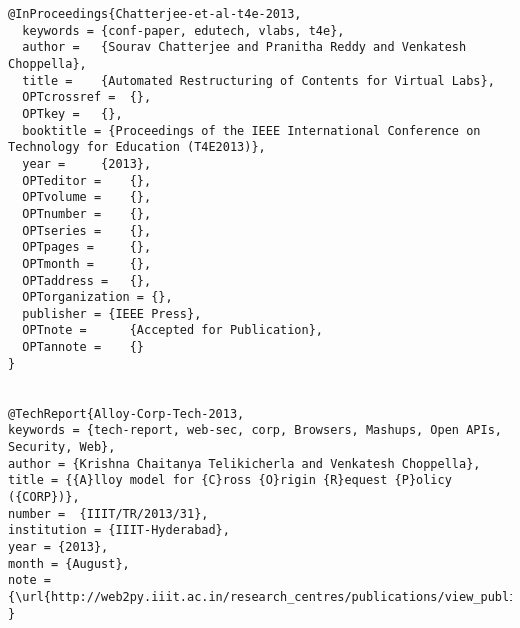 \documentclass[11pt]{article}
\begin{document}
\begin{lstlisting}
@InProceedings{Chatterjee-et-al-t4e-2013,
  keywords = {conf-paper, edutech, vlabs, t4e},
  author = 	 {Sourav Chatterjee and Pranitha Reddy and Venkatesh Choppella},
  title = 	 {Automated Restructuring of Contents for Virtual Labs},
  OPTcrossref =  {},
  OPTkey = 	 {},
  booktitle = {Proceedings of the IEEE International Conference on Technology for Education (T4E2013)},
  year = 	 {2013},
  OPTeditor = 	 {},
  OPTvolume = 	 {},
  OPTnumber = 	 {},
  OPTseries = 	 {},
  OPTpages = 	 {},
  OPTmonth = 	 {},
  OPTaddress = 	 {},
  OPTorganization = {},
  publisher = {IEEE Press},
  OPTnote = 	 {Accepted for Publication},
  OPTannote = 	 {}
}


@TechReport{Alloy-Corp-Tech-2013,
keywords = {tech-report, web-sec, corp, Browsers, Mashups, Open APIs, Security, Web},
author = {Krishna Chaitanya Telikicherla and Venkatesh Choppella},
title = {{A}lloy model for {C}ross {O}rigin {R}equest {P}olicy ({CORP})},
number =  {IIIT/TR/2013/31},
institution = {IIIT-Hyderabad},
year = {2013},
month = {August},
note = {\url{http://web2py.iiit.ac.in/research_centres/publications/view_publication/techreport/112}},
}



\end{lstlisting}
\end{document}
